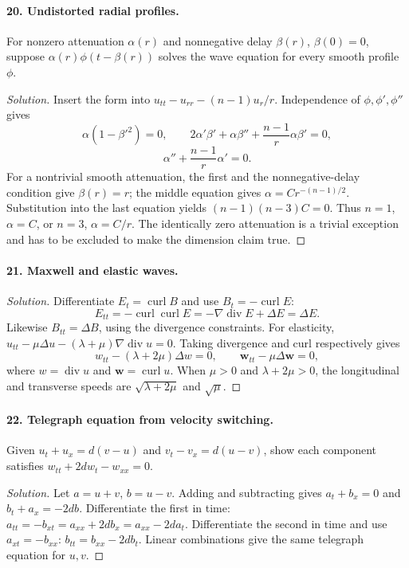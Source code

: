 \paragraph{20. Undistorted radial profiles.}
For nonzero attenuation $\alpha(r)$ and nonnegative delay $\beta(r)$,
$\beta(0)=0$, suppose $\alpha(r)\phi(t-\beta(r))$ solves the wave
equation for every smooth profile $\phi$.
\begin{proof}[Solution]
Insert the form into $u_{tt}-u_{rr}-(n-1)u_r/r$.
Independence of $\phi,\phi',\phi''$ gives
\[
 \alpha(1-\beta'^2)=0,\qquad
 2\alpha'\beta'+\alpha\beta''+\frac{n-1}r\alpha\beta'=0,
\]
\[
 \alpha''+\frac{n-1}r\alpha'=0.
\]
For a nontrivial smooth attenuation, the first and the nonnegative-delay
condition give $\beta(r)=r$; the middle equation gives
$\alpha=Cr^{-(n-1)/2}$.
Substitution into the last equation yields
$(n-1)(n-3)C=0$. Thus $n=1$, $\alpha=C$, or $n=3$, $\alpha=C/r$.
The identically zero attenuation is a trivial exception and has to be
excluded to make the dimension claim true.
\end{proof}
\Needspace{45mm}

\paragraph{21. Maxwell and elastic waves.}
\begin{proof}[Solution]
Differentiate $E_t=\operatorname{curl}B$ and use
$B_t=-\operatorname{curl}E$:
\[
 E_{tt}=-\operatorname{curl}\operatorname{curl}E
       =-\nabla\operatorname{div}E+\Delta E=\Delta E.
\]
Likewise $B_{tt}=\Delta B$, using the divergence constraints.
For elasticity,
$u_{tt}-\mu\Delta u-(\lambda+\mu)\nabla\operatorname{div}u=0$.
Taking divergence and curl respectively gives
\[
 w_{tt}-(\lambda+2\mu)\Delta w=0,\qquad
 \mathbf w_{tt}-\mu\Delta\mathbf w=0,
\]
where $w=\operatorname{div}u$ and $\mathbf w=\operatorname{curl}u$.
When $\mu>0$ and $\lambda+2\mu>0$, the longitudinal and transverse
speeds are $\sqrt{\lambda+2\mu}$ and $\sqrt\mu$.
\end{proof}

\paragraph{22. Telegraph equation from velocity switching.}
Given $u_t+u_x=d(v-u)$ and $v_t-v_x=d(u-v)$, show each component satisfies
$w_{tt}+2dw_t-w_{xx}=0$.
\begin{proof}[Solution]
Let $a=u+v$, $b=u-v$. Adding and subtracting gives
$a_t+b_x=0$ and $b_t+a_x=-2db$.
Differentiate the first in time:
$a_{tt}=-b_{xt}=a_{xx}+2db_x=a_{xx}-2da_t$.
Differentiate the second in time and use $a_{xt}=-b_{xx}$:
$b_{tt}=b_{xx}-2db_t$.
Linear combinations give the same telegraph equation for $u,v$.
\end{proof}

